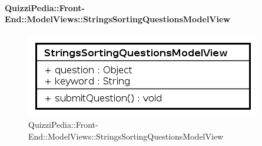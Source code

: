 \paragraph{QuizziPedia::Front-End::ModelViews::StringsSortingQuestionsModelView}
\begin{figure} [ht]
	\centering
	\includegraphics[scale=0.80]{UML/Classi/Front-End/QuizziPedia_Front-end_ModelView_StringsSortingQuestionsModelView.png}
	\caption{QuizziPedia::Front-End::ModelViews::StringsSortingQuestionsModelView}
\end{figure} \FloatBarrier
